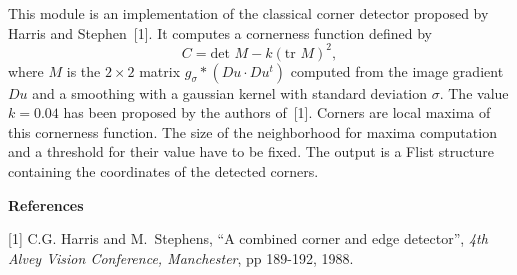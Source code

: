 This module is an implementation of the classical corner detector proposed by
Harris and Stephen~[1]. It computes a cornerness function defined by
$$C=\mbox{det }M-k(\mbox{tr }M)^2,$$
where $M$ is the $2\times 2$ matrix $g_\sigma*(Du\cdot Du ^t)$ computed from
the image gradient $Du$ and a smoothing with a gaussian kernel with standard
deviation $\sigma$. The value $k=0.04$ has been proposed by the authors of~[1].
Corners are local maxima of this cornerness function. The
size of the neighborhood for maxima computation and a threshold for their value
have to be fixed.
The output is a Flist structure containing the coordinates of the detected
corners.   

\bigskip
{\Large\bf References}

\medskip

[1] C.G. Harris and M.~Stephens, ``A combined corner and edge detector'',
{\it 4th Alvey Vision Conference, Manchester}, pp 189-192, 1988.
